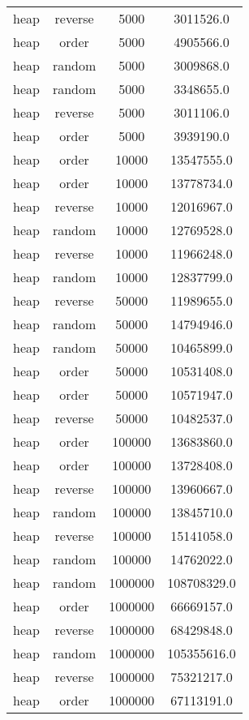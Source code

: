 \begin{table}
\begin{tabular}{cccc}
heap & reverse & 5000 & 3011526.0 \\
heap & order & 5000 & 4905566.0 \\
heap & random & 5000 & 3009868.0 \\
heap & random & 5000 & 3348655.0 \\
heap & reverse & 5000 & 3011106.0 \\
heap & order & 5000 & 3939190.0 \\
heap & order & 10000 & 13547555.0 \\
heap & order & 10000 & 13778734.0 \\
heap & reverse & 10000 & 12016967.0 \\
heap & random & 10000 & 12769528.0 \\
heap & reverse & 10000 & 11966248.0 \\
heap & random & 10000 & 12837799.0 \\
heap & reverse & 50000 & 11989655.0 \\
heap & random & 50000 & 14794946.0 \\
heap & random & 50000 & 10465899.0 \\
heap & order & 50000 & 10531408.0 \\
heap & order & 50000 & 10571947.0 \\
heap & reverse & 50000 & 10482537.0 \\
heap & order & 100000 & 13683860.0 \\
heap & order & 100000 & 13728408.0 \\
heap & reverse & 100000 & 13960667.0 \\
heap & random & 100000 & 13845710.0 \\
heap & reverse & 100000 & 15141058.0 \\
heap & random & 100000 & 14762022.0 \\
heap & random & 1000000 & 108708329.0 \\
heap & order & 1000000 & 66669157.0 \\
heap & reverse & 1000000 & 68429848.0 \\
heap & random & 1000000 & 105355616.0 \\
heap & reverse & 1000000 & 75321217.0 \\
heap & order & 1000000 & 67113191.0 \\
\end{tabular}
\end{table}
